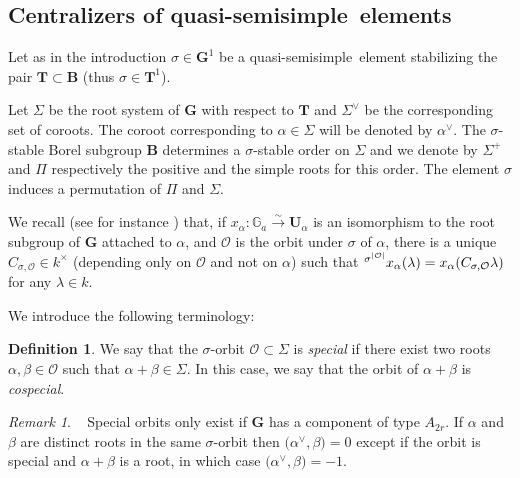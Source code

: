 \documentclass{amsart}
\numberwithin{equation}{section}
\theoremstyle{definition}
\newtheorem{definition}[equation]{Definition}
\theoremstyle{remark}
\newtheorem{remark}[equation]{Remark}
\newcommand\Ga{{\mathbb G_a}}
\newcommand\bB{{\mathbf B}}
\newcommand\bG{{\mathbf G}}
\newcommand\bT{{\mathbf T}}
\newcommand\bU{{\mathbf U}}
\newcommand\CO{{\mathcal O}}
\newcommand\Gun{{\bG^1}}
\newcommand\Tun{{\bT^1}}
\newcommand\lexp[2]{\kern\scriptspace\vphantom{#2}^{#1}\kern-\scriptspace#2}
\newcommand\qss{quasi-semisimple}
\newcommand\pairing[2]{{\mathopen(#1,#2\mathclose)}}
\begin{document}
\subsection*{Centralizers of \qss\ elements}
Let as in the introduction $\sigma\in\Gun$ be a \qss\ element stabilizing the
pair $\bT\subset\bB$ (thus $\sigma\in\Tun$).

Let  $\Sigma$  be  the  root  system  of  $\bG$  with  respect to $\bT$ and
$\Sigma^\vee$  be  the  corresponding  set of coroots. The coroot corresponding to
$\alpha\in\Sigma$ will be denoted by $\alpha^\vee$.
The  $\sigma$-stable Borel
subgroup $\bB$ determines a $\sigma$-stable order on $\Sigma$ and we denote
by  $\Sigma^+$ and $\Pi$ respectively the positive and the simple roots for
this order.
The element $\sigma$ induces a permutation of $\Pi$ and $\Sigma$.

We  recall  (see for instance \cite[1.8(v)]{grnc}) that,  
if  $x_\alpha:\Ga\xrightarrow\sim\bU_\alpha$  is  an 
isomorphism  to the root subgroup of  $\bG$ attached to $\alpha$, and $\CO$
is  the orbit under $\sigma$ of $\alpha$, there is a unique 
\index{Csigma@$C_{\sigma,\CO}$}
$C_{\sigma,\CO}\in k^\times$ (depending only on $\CO$ and not on $\alpha$)
such that $\lexp{\sigma^{|\CO|}}x_\alpha(\lambda)=
x_\alpha(C_{\sigma,\CO}\lambda)$   for   any   $\lambda\in   k$. 


We introduce the following terminology:
\begin{definition}
We say that the $\sigma$-orbit $\CO\subset\Sigma$ is {\em special} if there
exist two roots $\alpha,\beta\in\CO$ such  that  $\alpha+\beta\in\Sigma$.
In this case, we say that the orbit of $\alpha+\beta$ is {\em cospecial}.
\end{definition}

\begin{remark}\label{roots orthogonal}~
Special orbits only exist if $\bG$ has a component of type $A_{2r}$.
If $\alpha$ and $\beta $ are distinct roots in the same $\sigma$-orbit then 
$\pairing{\alpha^\vee}\beta= 0$ except if the orbit is special and 
$\alpha+\beta$ is a root, in which case $\pairing{\alpha^\vee}\beta=-1$.
\end{remark}
\end{document}

